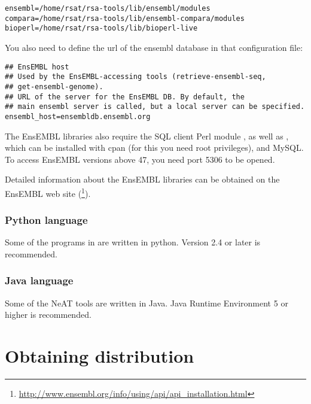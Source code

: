 \documentclass{book}
\begin{document}
\begin{footnotesize}
\begin{verbatim}
ensembl=/home/rsat/rsa-tools/lib/ensembl/modules
compara=/home/rsat/rsa-tools/lib/ensembl-compara/modules
bioperl=/home/rsat/rsa-tools/lib/bioperl-live
\end{verbatim}
\end{footnotesize}

You also need to define the url of the ensembl database in that configuration file:

\begin{footnotesize}
\begin{verbatim}
## EnsEMBL host
## Used by the EnsEMBL-accessing tools (retrieve-ensembl-seq,
## get-ensembl-genome).
## URL of the server for the EnsEMBL DB. By default, the
## main ensembl server is called, but a local server can be specified.
ensembl_host=ensembldb.ensembl.org
\end{verbatim}
\end{footnotesize}

The EnsEMBL libraries also require the SQL client Perl module
, as well as , which can be installed with cpan (for this you need
root privileges), and MySQL. To access EnsEMBL versions above 47, you need
port 5306 to be opened.

Detailed information about the EnsEMBL libraries can be obtained on
the EnsEMBL web site
(\footnote{\url{http://www.ensembl.org/info/using/api/api\_installation.html}}).

\subsection{Python language}

Some of the programs in \RSAT are written in python. Version 2.4 or
later is recommended.

\subsection{Java language}

Some of the NeAT tools are written in Java. Java Runtime Environment 5 or higher is recommended.

\chapter{Obtaining \RSAT distribution}
\end{document}
